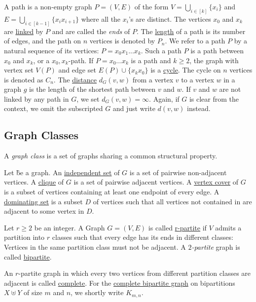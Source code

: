 \begin{definition}
    A path is a non-empty graph $P = (V,E)$ of the form $V = \bigcup_{i  \in [k]} \{x_i\}$ and $E = \bigcup_{i \in  [k-1]} \{x_ix_{i+1}\}$ where all the $x_i$'s are distinct. 
    The vertices $x_0$ and $x_k$ are \underline{linked} by $P$ and are called the \textit{ends} of $P$. The \underline{length} of a path is its number of edges, and the path on $n$ vertices is denoted by  $P_n$. 
    We refer to a path $P$ by a natural sequence of its vertices: $P = x_0x_1...x_k$. Such a path $P$ is a path between $x_0$ and $x_k$, or a $x_0,x_k$-path.
    If $P = x_0...x_k$ is a path and $k \geq 2$, the graph with vertex set $V(P)$ and edge set $E(P) \cup \{x_kx_0\}$ is a \underline{cycle}. The cycle on $n$ vertices is denoted as $C_n$.
    The \underline{distance} $d_G(v,w)$ from a vertex $v$ to a vertex $w$ in a graph $g$ is the length of the shortest path between $v$ and $w$. If $v$ and $w$ are not linked by any path in $G$, we set $d_G(v,w) = \infty$. Again, if $G$ is clear from the context, we omit the subscripted $G$ and just write $d(v,w)$ instead.
\end{definition}

\subsection{Graph Classes}

A \textit{graph class} is a set of graphs sharing a common structural property.

\begin{definition}
Let \G be a graph.
An  \underline{independent set} of $G$ is a set of pairwise non-adjacent vertices. 
A \underline{clique} of $G$ is a set of pairwise adjacent vertices. 
A \underline{vertex cover} of $G$ is a subset of vertices containing at least one endpoint of every edge. 
A \underline{dominating set} is a subset $D$ of vertices such that all vertices not contained in are adjacent to some vertex in $D$.
\end{definition}

\begin{graphclass}[r-partite]
    Let $r \geq 2$ be an integer. A Graph $G = (V, E)$ is called \underline{r-partite} if $V$ admits a partition into $r$ classes such that every edge has its ends in different classes: Vertices in the same partition class must not be adjacent. 
    A \textit{$2$-partite} graph is called \underline{bipartite}. 
    
    An $r$-partite graph in which every two vertices from different partition classes are adjacent is called \underline{complete}. For the \underline{complete bipartite graph} on bipartitions $X \uplus Y$ of size $m$ and $n$, we shortly write $K_{m,n}$. 
\end{graphclass}

